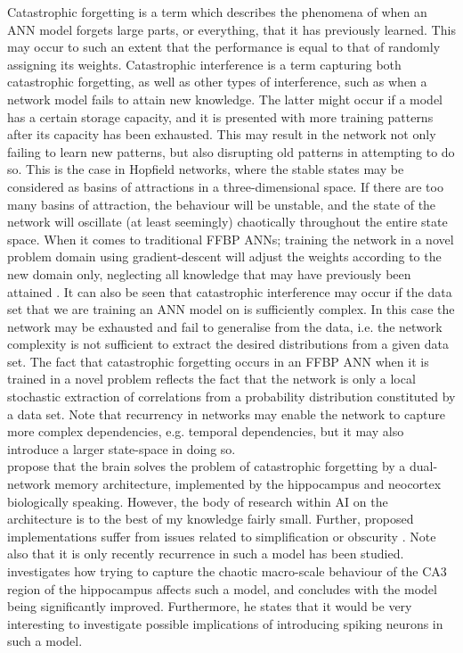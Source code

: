 Catastrophic forgetting \citep{McCloskey1989, Ratcliff1990} is a term which describes the phenomena of when an ANN model forgets large parts, or everything, that it has previously learned. This may occur to such an extent that the performance is equal to that of randomly assigning its weights. Catastrophic interference is a term capturing both catastrophic forgetting, as well as other types of interference, such as when a network model fails to attain new knowledge. The latter might occur if a model has a certain storage capacity, and it is presented with more training patterns after its capacity has been exhausted. This may result in the network not only failing to learn new patterns, but also disrupting old patterns in attempting to do so. This is the case in Hopfield networks, where the stable states may be considered as basins of attractions in a three-dimensional space. If there are too many basins of attraction, the behaviour will be unstable, and the state of the network will oscillate (at least seemingly) chaotically throughout the entire state space.
When it comes to traditional FFBP ANNs; training the network in a novel problem domain using gradient-descent will adjust the weights according to the new domain only, neglecting all knowledge that may have previously been attained \citep{McCloskey1989, French1999, French2001}.
It can also be seen that catastrophic interference may occur if the data set that we are training an ANN model on is sufficiently complex. In this case the network may be exhausted and fail to generalise from the data, i.e. the network complexity is not sufficient to extract the desired distributions from a given data set. 
The fact that catastrophic forgetting occurs in an FFBP ANN when it is trained in a novel problem reflects the fact that the network is only a local stochastic extraction of correlations from a probability distribution constituted by a data set. Note that recurrency in networks may enable the network to capture more complex dependencies, e.g. temporal dependencies, but it may also introduce a larger state-space in doing so.
\\

\citet{McClelland1995} propose that the brain solves the problem of catastrophic forgetting by a dual-network memory architecture, implemented by the hippocampus and neocortex biologically speaking. However, the body of research within AI on the architecture is to the best of my knowledge fairly small. Further, proposed implementations suffer from issues related to simplification or obscurity \citep{French1997, French2001, Hattori2010, Hattori2014}. Note also that it is only recently recurrence in such a model has been studied. \citet{Hattori2014} investigates how trying to capture the chaotic macro-scale behaviour of the CA3 region of the hippocampus affects such a model, and concludes with the model being significantly improved. Furthermore, he states that it would be very interesting to investigate possible implications of introducing spiking neurons in such a model.
\\

